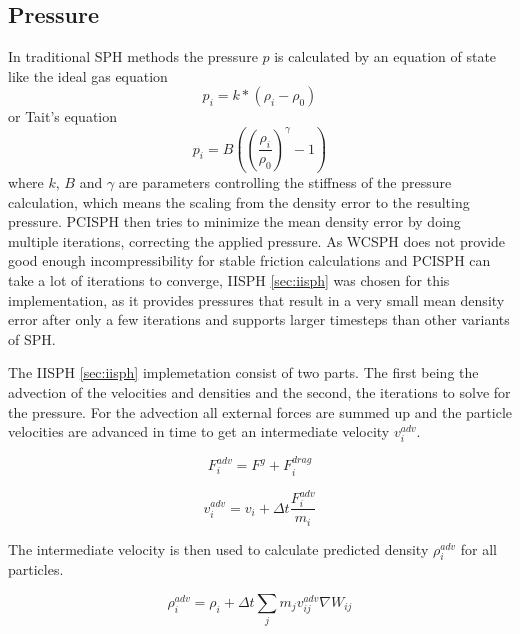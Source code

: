 \documentclass[intern]{cgMA}
\begin{document}
    \subsection{Pressure} \label{sec:pressure}
    In traditional SPH methods the pressure $p$ is calculated by an equation of state like the ideal gas equation \cite{wcsph}
    \begin{equation}
        p_i = k * (\rho_i - \rho_0)
    \end{equation}
    or Tait's equation \cite{wcsph}
    \begin{equation}
        p_i = B ((\frac{\rho_i}{\rho_0})^{\gamma} - 1)
    \end{equation}
    where $k$, $B$ and $\gamma$ are parameters controlling the stiffness of the pressure calculation, which means the scaling from the density error to the resulting pressure.
    PCISPH then tries to minimize the mean density error by doing multiple iterations, correcting the applied pressure. As WCSPH does not provide good enough incompressibility for stable friction calculations and PCISPH can take a lot of iterations to converge, IISPH \ref{sec:iisph} was chosen for this implementation, as it provides pressures that result in a very small mean density error after only a few iterations and supports larger timesteps than other variants of SPH.

    The IISPH \ref{sec:iisph} implemetation consist of two parts. The first being the advection of the velocities and densities and the second, the iterations to solve for the pressure. For the advection all external forces are summed up and the particle velocities are advanced in time to get an intermediate velocity $v_i^{adv}$. \cite{6570475}

    \begin{equation}
        F_i^{adv} = F^g + F_i^{drag}
    \end{equation}

    \begin{equation}
        v_i^{adv} = v_i + \Delta t \frac{F_i^{adv}}{m_i}
    \end{equation}

    The intermediate velocity is then used to calculate predicted density $\rho_i^{adv}$ for all particles. \cite{6570475}

    \begin{equation}
        \rho_i^{adv} = \rho_i + \Delta t \sum_j m_j v_{ij}^{adv} \nabla W_{ij}
    \end{equation}
    
\end{document}
